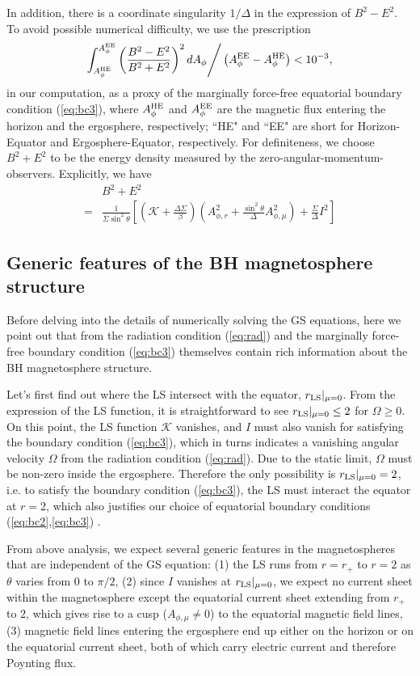 \documentclass[aps,prd,reprint,nofootinbib, superscriptaddress]{revtex4-1}
\def\sst{\sin^2\theta}
\def\Ar{A_{\phi,r}}
\def\Am{A_{\phi,\mu}}
\def\be{\begin{equation}}
\def\ee{\end{equation}}
\def\AHE{A_\phi^{\rm HE}}
\def\AEE{A_\phi^{\rm EE}}
\begin{document}
In addition, there is a coordinate singularity $1/\Delta$ in the expression of $B^2-E^2$.
To avoid possible numerical difficulty, we use the prescription
\be
\label{eq:nbc}
\int_{A_\phi^{\rm HE}}^{A_\phi^{\rm EE}} \left(\frac{B^2-E^2}{B^2+E^2}\right)^2 dA_\phi \Bigg/ \left(A_\phi^{\rm EE}- A_\phi^{\rm HE}\right)  < 10^{-3},
\ee
in our computation, as a proxy of the marginally force-free equatorial boundary condition (\ref{eq:bc3}),
where $\AHE$ and $\AEE$ are the magnetic flux entering the horizon and the ergosphere, respectively;
``HE" and ``EE" are short for Horizon-Equator and Ergosphere-Equator, respectively.
For definiteness, we choose $B^2+E^2$ to be the energy density measured by the zero-angular-momentum-observers.
Explicitly, we have
\be
\begin{aligned}
 & B^2+E^2   \\
=& \frac{1}{\Sigma \sst} \left[ \left(\mathcal{K}+\frac{\Delta\Sigma}{\beta} \right)
 \left(\Ar^2 +\frac{\sst}{\Delta}\Am^2 \right)
 +\frac{\Sigma}{\Delta}I^2\right]
\end{aligned}
\ee

\subsection{Generic features of the BH magnetosphere structure}
\label{subsec:features}
Before delving into the details of numerically solving the GS equations,
here we point out that from the radiation condition (\ref{eq:rad}) and the marginally
force-free boundary condition (\ref{eq:bc3})
themselves contain rich information about the BH magnetosphere structure.

Let's first find out where the LS intersect with the equator, $r_{\rm LS}|_{\mu=0}$.
From the expression of the LS function, it is straightforward to see $ r_{\rm LS}|_{\mu=0} \leq 2$ for $\Omega \geq 0$.
On this point,  the LS function $\mathcal K$ vanishes,
and $I$ must also vanish for satisfying the boundary condition (\ref{eq:bc3}),
which in turns indicates a vanishing angular velocity $\Omega$ from
the radiation condition (\ref{eq:rad}).  Due to the static limit, $\Omega$
must be non-zero inside the ergosphere.  Therefore the only possibility is  $r_{\rm LS}|_{\mu=0} = 2$, i.e.
to satisfy the boundary condition (\ref{eq:bc3}), the LS must interact the equator at $r=2$, which also
justifies our choice of equatorial boundary conditions (\ref{eq:bc2},\ref{eq:bc3}) .

From above analysis, we expect several generic features in the magnetospheres that are independent
of the GS equation:
(1) the LS runs from $r=r_+$ to $r=2$ as $\theta$ varies from $0$ to $\pi/2$,
(2) since $I$ vanishes at $r_{\rm LS}|_{\mu=0}$, we expect no current sheet within the magnetosphere except the equatorial current
sheet extending from $r_+$ to $2$, which gives rise to a cusp ($\Am \neq 0$) to the equatorial magnetic field lines,
(3) magnetic field lines entering the ergosphere end up either on the horizon or on the equatorial current sheet,
both of which carry electric current and therefore Poynting flux.
\end{document}
